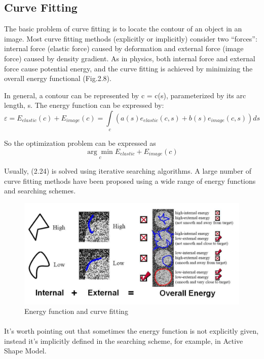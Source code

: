 \documentclass[12pt, twoside]{report}
\begin{document}
		\subsection{Curve Fitting}
		The basic problem of curve fitting is to locate the contour of an object in an image. Most
		curve fitting methods (explicitly or implicitly) consider two “forces”: internal force (elastic
		force) caused by deformation and external force (image force) caused by density gradient.
		As in physics, both internal force and external force cause potential energy, and the curve
		fitting is achieved by minimizing the overall energy functional (Fig.2.8).
		
		In general, a contour can be represented by c = c(s), parameterized by its arc length,
		s. The energy function can be expressed by:
		\begin{equation}
			\varepsilon = E_{elastic}(c) + E_{image}(c) = \int\limits_c (a(s)e_{elastic}(c,s) + b(s)e_{image}(c,s))ds
		\end{equation}
		
		So the optimization problem can be expressed as
		\begin{equation}
			\underset{c}{\arg\min}E_{elastic} + E_{image}(c)
		\end{equation}
		
		Usually, (2.24) is solved using iterative searching algorithms. A large number of curve
		fitting methods have been proposed using a wide range of energy functions and searching
		schemes.
	\newpage
	
	\begin{figure}[h!]
		\centering
	\includegraphics[width=\textwidth]{img/18_1.png}     
		\caption{Energy function and curve fitting}
		\label{fig:face}
	\end{figure}

	\paragraph{}
	It’s worth pointing out that sometimes the energy function is not explicitly given,
	instead it’s implicitly defined in the searching scheme, for example, in Active Shape Model.
\end{document}
